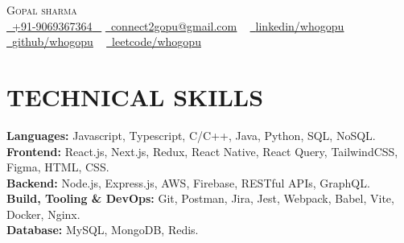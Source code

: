 \documentclass[letterpaper,11pt]{article}
\begin{document}


\begin{center}
    {\Huge \scshape Gopal sharma} \\ 
    \small \href{tel:+919069367364}{ \raisebox{-0.1\height}\faPhone\ \underline{+91-9069367364} ~} \href{mailto:connect2gopu@gmail.com}{\raisebox{-0.2\height}\faEnvelope\  \underline{connect2gopu@gmail.com}} ~ 
    \href{https://linkedin.com/in/whogopu}{\raisebox{-0.2\height}\faLinkedinSquare\ \underline{linkedin/whogopu}}  ~
    \href{https://github.com/whogopu}{\raisebox{-0.2\height}\faGithub\ \underline{github/whogopu}} ~
    \href{https://leetcode.com/u/whogopu/}{\raisebox{-0.2\height}\faCode\ \underline{leetcode/whogopu}} ~
\end{center}

\section{TECHNICAL SKILLS}
 \begin{itemize}[leftmargin=0.15in, label={}]
    \small{\item{
     \textbf{\normalsize{Languages:}}{ \normalsize{Javascript, Typescript,  C/C++,  Java, Python,  SQL, NoSQL.}} \\
     \textbf{\normalsize{Frontend:}}{ \normalsize{React.js, Next.js,  Redux,  React Native, React Query,  TailwindCSS, Figma, HTML, CSS.}} \\
    \textbf{\normalsize{Backend:}}{ \normalsize{Node.js, Express.js, AWS, Firebase, RESTful APIs, GraphQL.}} \\
    \textbf{\normalsize{Build, Tooling \& DevOps:}}{ \normalsize{Git, Postman, Jira, Jest, Webpack, Babel, Vite, Docker, Nginx.}} \\
    
     \textbf{\normalsize{Database:}}{\normalsize{ MySQL, MongoDB, Redis.}} \\

    }}
 \end{itemize}
 \vspace{-15pt}
\end{document}
